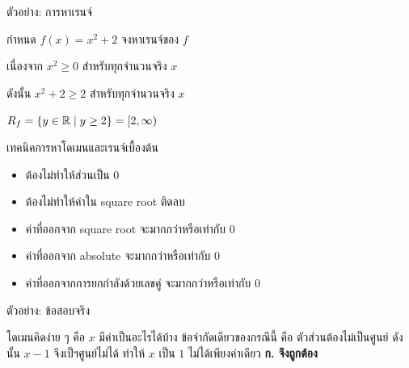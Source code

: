 \documentclass[11pt, aspectratio=169]{beamer}
\begin{document}
\begin{frame}{ตัวอย่าง: การหาเรนจ์}
  \begin{exambox}[โจทย์]
    กำหนด $f(x) = x^2 + 2$ จงหาเรนจ์ของ $f$
  \end{exambox}

  \begin{solbox}[วิธีทำ]
    เนื่องจาก $x^2 \geq 0$ สำหรับทุกจำนวนจริง $x$

    ดังนั้น $x^2 + 2 \geq 2$ สำหรับทุกจำนวนจริง $x$

    \medskip
    $R_f = \{y \in \mathbb{R} \mid y \geq 2\} = [2, \infty)$
  \end{solbox}
\end{frame}

\begin{frame}{เทคนิคการหาโดเมนและเรนจ์เบื้องต้น}
  \begin{explanation}[โดเมน]
    \begin{itemize}
      \item ต้องไม่ทำให้ส่วนเป็น 0
      \item ต้องไม่ทำให้ค่าใน square root ติดลบ
    \end{itemize}
  \end{explanation}
  \begin{explanation}[เรนจ์]
    \begin{itemize}
      \item ค่าที่ออกจาก square root จะมากกว่าหรือเท่ากับ 0
      \item ค่าที่ออกจาก absolute จะมากกว่าหรือเท่ากับ 0
      \item ค่าที่ออกจากการยกกำลังด้วยเลขคู่ จะมากกว่าหรือเท่ากับ 0
    \end{itemize}
  \end{explanation}
\end{frame}

\begin{frame}{ตัวอย่าง: ข้อสอบจริง}

  \begin{solbox}[วิธีทำ]
    โดเมนคิดง่าย ๆ คือ $x$ มีค่าเป็นอะไรได้บ้าง ข้อจำกัดเดียวของกรณีนี้ คือ ตัวส่วนต้องไม่เป็นศูนย์\newline
    ดังนั้น $x-1$ จึงเป็ฯศูนย์ไม่ได้ ทำให้ $x$ เป็น $1$ ไม่ได้เพียงค่าเดียว\newline
    \textbf{ก. จึงถูกต้อง}
  \end{solbox}
\end{frame}
\end{document}
